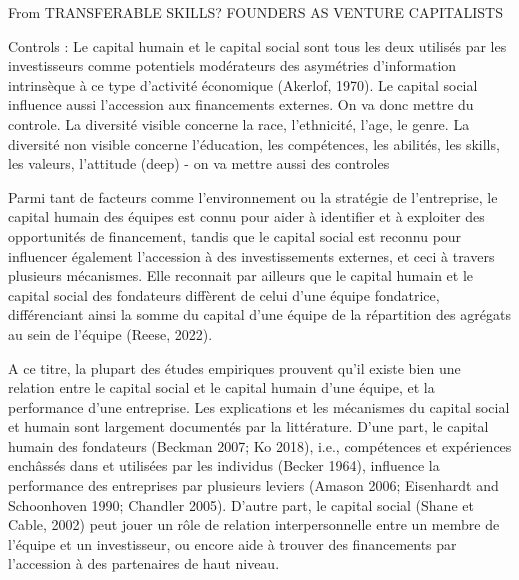 \documentclass[12pt]{article}
\begin{document}
From TRANSFERABLE SKILLS? FOUNDERS AS VENTURE CAPITALISTS

Controls : Le capital humain et le capital social sont tous les deux utilisés par les investisseurs comme potentiels modérateurs des asymétries d'information intrinsèque à ce type d'activité économique (Akerlof, 1970). Le capital social influence aussi l'accession aux financements externes. On va donc mettre du controle. La diversité visible concerne la race, l'ethnicité, l'age, le genre. La diversité non visible concerne l'éducation, les compétences, les abilités, les skills, les valeurs, l'attitude (deep) - on va mettre aussi des controles

Parmi tant de facteurs comme l'environnement ou la stratégie de l'entreprise, le capital humain des équipes est connu pour aider à identifier et à exploiter des opportunités de financement, tandis que le capital social est reconnu pour influencer également l'accession à des investissements externes, et ceci à travers plusieurs mécanismes. Elle reconnait par ailleurs que le capital humain et le capital social des fondateurs diffèrent de celui d'une équipe fondatrice, différenciant ainsi la somme du capital d'une équipe de la répartition des agrégats au sein de l'équipe (Reese, 2022).

A ce titre, la plupart des études empiriques prouvent qu'il existe bien une relation entre le capital social et le capital humain d'une équipe, et la performance d'une entreprise. Les explications et les mécanismes du capital social et humain sont largement documentés par la littérature. D'une part, le capital humain des fondateurs (Beckman 2007; Ko 2018), i.e., compétences et expériences enchâssés dans et utilisées par les individus (Becker 1964), influence la performance des entreprises par plusieurs leviers (Amason 2006; Eisenhardt and Schoonhoven 1990; Chandler 2005). D'autre part, le capital social (Shane et Cable, 2002) peut jouer un rôle de relation interpersonnelle entre un membre de l'équipe et un investisseur, ou encore aide à trouver des financements par l'accession à des partenaires de haut niveau.
\end{document}
